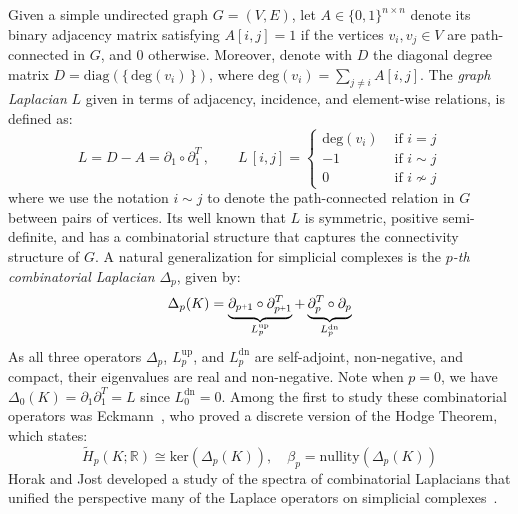 \documentclass[12pt]{article}
\numberwithin{equation}{section}
\newcommand{\+}{%
	\raisebox{0.18ex}{\scaleobj{0.55}{+}}
}
\theoremstyle{definition}
\begin{document}
Given a simple undirected graph $G = (V, E)$, let $A \in \{0,1\}^{n \times n}$ denote its binary adjacency matrix satisfying $A[i,j] = 1$ if the vertices $v_i,v_j \in V$ are path-connected in $G$, and $0$ otherwise. Moreover, denote with $D$ the diagonal degree matrix $D = \mathrm{diag}(\{ \, \mathrm{deg}(v_i) \, \})$, where $\mathrm{deg}(v_i) = \sum_{j \neq i} A[i,j]$.
The \emph{graph Laplacian} $L$ given in terms of adjacency, incidence, and element-wise relations, is defined as: 
\begin{equation}
L = D - A = \partial_1 \circ \partial_1^T \, , \quad\quad
	L\,[i,j] = \begin{cases}
		\mathrm{deg}(v_i) & \text{ if } i = j \\
		-1 & \text{ if } i \sim j \\
		0 & \text{ if } i \nsim j
	\end{cases}
\end{equation}
where we use the notation $i \sim j$ to denote the path-connected relation in $G$ between pairs of vertices. 
Its well known that $L$ is symmetric, positive semi-definite, and has a combinatorial structure that captures the connectivity structure of $G$. 
A natural generalization for simplicial complexes is the \emph{$p$-th combinatorial Laplacian} $\Delta_p$, given by: 
\begin{equation}
	\Delta_p(K) = 
	\underbrace{\partial_{p\+1} \circ \partial_{p\+1}^T}_{L_p^{\text{up}}} + \underbrace{\partial_{p}^T  \circ  \partial_{p}}_{L_p^{\text{dn}}} 
\end{equation}
As all three operators $\Delta_p$, $L_p^{\text{up}}$, and $L_p^{\text{dn}}$ are self-adjoint, non-negative, and compact, their eigenvalues are real and non-negative.
Note when $p = 0$, we have $\Delta_0(K) = \partial_1 \partial_1^T = L$ since $L_0^{\text{dn}} = 0$.
Among the first to study these combinatorial operators was Eckmann~\cite{}, who proved a discrete version of the Hodge Theorem, which states: 
\begin{equation}\label{eq:laplace_hom}
	\tilde{H}_p(K; \mathbb{R}) \cong \mathrm{ker}(\Delta_p(K)), \quad \beta_p = \mathrm{nullity}(\Delta_p(K))
\end{equation}
Horak and Jost developed a study of the spectra of combinatorial Laplacians that unified the perspective many of the Laplace operators on simplicial complexes~\cite{}. 
\end{document}
